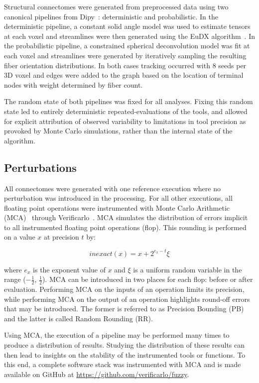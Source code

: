 \documentclass[fleqn,10pt]{SelfArx} %
\begin{document}
Structural connectomes were generated from preprocessed data using two canonical pipelines from
Dipy~\cite{Garyfallidis2014-ql}: deterministic and probabilistic. In the deterministic pipeline, a constant solid angle
model was used to estimate tensors at each voxel and streamlines were then generated using the EuDX
algorithm~\cite{Garyfallidis2012-gg}. In the probabilistic pipeline, a constrained spherical deconvolution model was
fit at each voxel and streamlines were generated by iteratively sampling the resulting fiber orientation distributions.
In both cases tracking occurred with $8$ seeds per 3D voxel and edges were added to the graph based on the location of
terminal nodes with weight determined by fiber count.

The random state of both pipelines was fixed for all analyses. Fixing this random state led to entirely
deterministic repeated-evaluations of the tools, and allowed for explicit attribution of observed variability to
limitations in tool precision as provoked by Monte Carlo simulations, rather than the internal state of the algorithm.

\subsection*{Perturbations}
All connectomes were generated with one reference execution where no perturbation was introduced in the processing. For
all other executions, all floating point operations were instrumented with Monte Carlo Arithmetic
(MCA)~\cite{Parker1997-qq} through Verificarlo~\cite{Denis2016-wo}. MCA simulates the distribution of errors implicit
to all instrumented floating point operations (flop). This rounding is performed on a value $x$ at precision $t$ by:

\begin{equation}
inexact(x) = x + 2^{e_x - t}\xi 
\label{eq:inexact}
\end{equation}

where $e_x$ is the exponent value of $x$ and $\xi$ is a uniform random variable in the range ($-\frac{1}{2}$,
$\frac{1}{2}$). MCA can be introduced in two places for each flop: before or after evaluation. Performing MCA on the
inputs of an operation limits its precision, while performing MCA on the output of an operation highlights round-off
errors that may be introduced. The former is referred to as Precision Bounding (PB) and the latter is called Random
Rounding (RR).

Using MCA, the execution of a pipeline may be performed many times to produce a distribution of results. Studying the
distribution of these results can then lead to insights on the stability of the instrumented tools or functions. To
this end, a complete software stack was instrumented with MCA and is made available on GitHub at
\url{https://github.com/verificarlo/fuzzy}.
\end{document}
